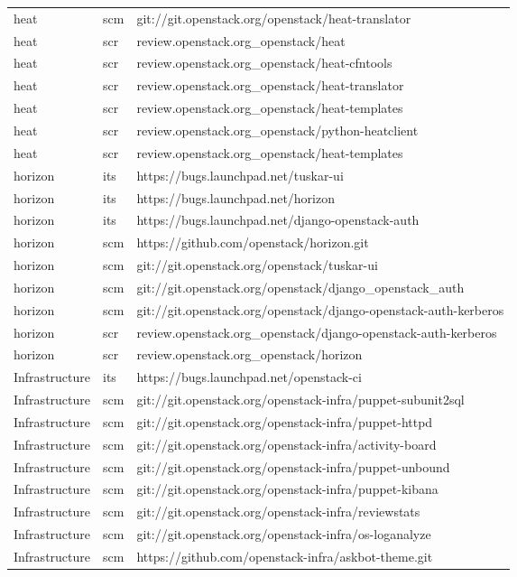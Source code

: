 \begin{center}
\begin{longtable}{|p{4cm}|p{1cm}|p{10cm}|}
heat&scm&git://git.openstack.org/openstack/heat-translator\\ 
heat&scr&review.openstack.org\_openstack/heat\\ 
heat&scr&review.openstack.org\_openstack/heat-cfntools\\ 
heat&scr&review.openstack.org\_openstack/heat-translator\\ 
heat&scr&review.openstack.org\_openstack/heat-templates\\ 
heat&scr&review.openstack.org\_openstack/python-heatclient\\ 
heat&scr&review.openstack.org\_openstack/heat-templates\\ 
horizon&its&https://bugs.launchpad.net/tuskar-ui\\ 
horizon&its&https://bugs.launchpad.net/horizon\\ 
horizon&its&https://bugs.launchpad.net/django-openstack-auth\\ 
horizon&scm&https://github.com/openstack/horizon.git\\ 
horizon&scm&git://git.openstack.org/openstack/tuskar-ui\\ 
horizon&scm&git://git.openstack.org/openstack/django\_openstack\_auth\\ 
horizon&scm&git://git.openstack.org/openstack/django-openstack-auth-kerberos\\ 
horizon&scr&review.openstack.org\_openstack/django-openstack-auth-kerberos\\ 
horizon&scr&review.openstack.org\_openstack/horizon\\ 
Infrastructure&its&https://bugs.launchpad.net/openstack-ci\\ 
Infrastructure&scm&git://git.openstack.org/openstack-infra/puppet-subunit2sql\\ 
Infrastructure&scm&git://git.openstack.org/openstack-infra/puppet-httpd\\ 
Infrastructure&scm&git://git.openstack.org/openstack-infra/activity-board\\ 
Infrastructure&scm&git://git.openstack.org/openstack-infra/puppet-unbound\\ 
Infrastructure&scm&git://git.openstack.org/openstack-infra/puppet-kibana\\ 
Infrastructure&scm&git://git.openstack.org/openstack-infra/reviewstats\\ 
Infrastructure&scm&git://git.openstack.org/openstack-infra/os-loganalyze\\ 
Infrastructure&scm&https://github.com/openstack-infra/askbot-theme.git\\ 

\end{longtable}
\end{center}

